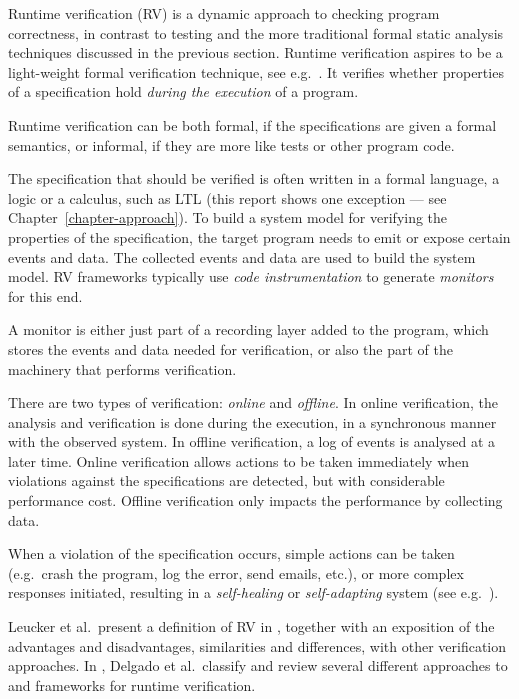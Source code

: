 Runtime verification (RV) is a dynamic approach to checking program
correctness, in contrast to testing and the more traditional formal static
analysis techniques discussed in the previous section. Runtime verification
aspires to be a light-weight formal verification technique, see e.g.\
\cite{leucker09abriefaccount,delgado04taxonomy}. It verifies whether properties
of a specification hold \textit{during the execution} of a program.

Runtime verification can be both formal, if the specifications are given a
formal semantics, or informal, if they are more like tests or other program
code.

The specification that should be verified is often written in a formal
language, a logic or a calculus, such as LTL \cite{pnueli77} (this report shows
one exception --- see Chapter~\ref{chapter-approach}). To build a system model
for verifying the properties of the specification, the target program needs to
emit or expose certain events and data. The collected events and data are used
to build the system model. RV frameworks typically use \textit{code
instrumentation} to generate \textit{monitors} for this end.

A monitor is either just part of a recording layer added to the program, which
stores the events and data needed for verification, or also the part of the
machinery that performs verification.

There are two types of verification: \emph{online} and \emph{offline}. In
online verification, the analysis and verification is done during the
execution, in a synchronous manner with the observed system. In offline
verification, a log of events is analysed at a later time. Online verification
allows actions to be taken immediately when violations against the
specifications are detected, but with considerable performance cost. Offline
verification only impacts the performance by collecting data.

When a violation of the specification occurs, simple actions can be taken
(e.g.\ crash the program, log the error, send emails, etc.), or more complex
responses initiated, resulting in a \textit{self-healing} or
\textit{self-adapting} system (see e.g.\ \cite{huebscher08survey}).

Leucker et al.\ present a definition of RV in \cite{leucker09abriefaccount},
together with an exposition of the advantages and disadvantages, similarities
and differences, with other verification approaches. In
\cite{delgado04taxonomy}, Delgado et al.\ classify and review several different
approaches to and frameworks for runtime verification.

